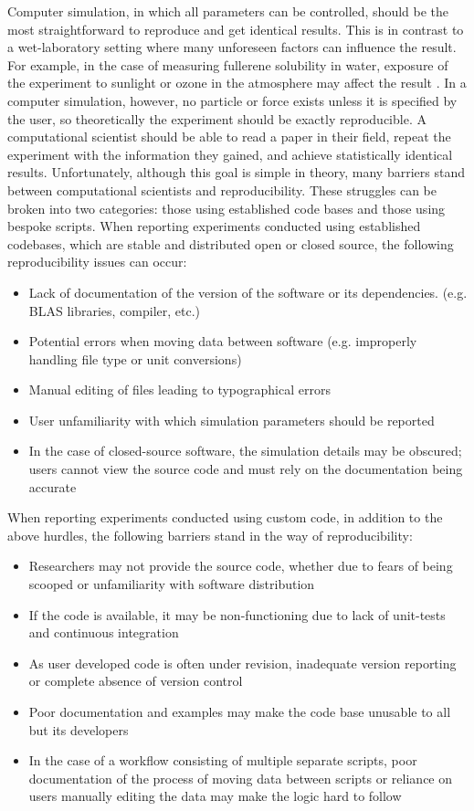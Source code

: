 Computer simulation, in which all parameters can be controlled, should be the most straightforward to reproduce and get identical results. 
This is in contrast to a wet-laboratory setting where many unforeseen factors can influence the result.
For example, in the case of measuring fullerene solubility in water, exposure of the experiment to sunlight or ozone in the atmosphere may affect the result \cite{Isaacson2009}.
In a computer simulation, however, no particle or force exists unless it is specified by the user, so theoretically the experiment should be exactly reproducible.
A computational scientist should be able to read a paper in their field, repeat the experiment with the information they gained, and achieve statistically identical results.
Unfortunately, although this goal is simple in theory, many barriers stand between computational scientists and reproducibility.
These struggles can be broken into two categories: those using established code bases and those using bespoke scripts.
When reporting experiments conducted using established codebases, which are stable and distributed open or closed source, the following reproducibility issues can occur:
\begin{itemize}
    \item Lack of documentation of the version of the software or its dependencies. (e.g. BLAS libraries, compiler, etc.)
    \item Potential errors when moving data between software (e.g. improperly handling file type or unit conversions)
    \item Manual editing of files leading to typographical errors
    \item User unfamiliarity with which simulation parameters should be reported
    \item In the case of closed-source software, the simulation details may be obscured; users cannot view the source code and must rely on the documentation being accurate
\end{itemize}
When reporting experiments conducted using custom code, in addition to the above hurdles, the following barriers stand in the way of reproducibility:
\begin{itemize}
    \item Researchers may not provide the source code, whether due to fears of being scooped or unfamiliarity with software distribution
    \item If the code is available, it may be non-functioning due to lack of unit-tests and continuous integration
    \item As user developed code is often under revision, inadequate version reporting or complete absence of version control
    \item Poor documentation and examples may make the code base unusable to all but its developers
    \item In the case of a workflow consisting of multiple separate scripts, poor documentation of the process of moving data between scripts or reliance on users manually editing the data may make the logic hard to follow
\end{itemize}
